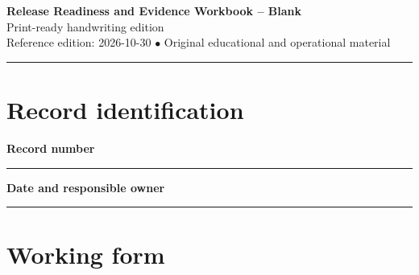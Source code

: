 \documentclass[10pt,letterpaper]{article}
\begin{document}
\begin{center}
{\LARGE\bfseries\color{cdblue}Release Readiness and Evidence Workbook -- Blank}\\[7pt]
{\large Print-ready handwriting edition}\\[6pt]
{\small Reference edition: 2026-10-30 $\bullet$ Original educational and operational material}
\end{center}
\noindent\color{cdblue}\rule{\linewidth}{1.2pt}\color{black}
\vspace{0.4em}
\section{Record identification}
\textbf{Record number}\par
\noindent\rule{\linewidth}{0.35pt}\par\vspace{0.7em}
\textbf{Date and responsible owner}\par
\noindent\rule{\linewidth}{0.35pt}\par\vspace{0.7em}

\section{Working form}
\end{document}
